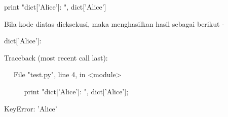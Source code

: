 \documentclass[a4paper,12pt]{report}
\begin{document}
\noindent 
 \hspace*{0.5in} print "dict['Alice']: ", dict['Alice'] \par
\begin{adjustwidth}{0.03in}{0.03in}
Bila kode diatas dieksekusi, maka menghasilkan hasil sebagai berikut -\end{adjustwidth}
 \par
\noindent 
{\fontsize{9pt}{9pt}\selectfont  \hspace*{0.5in} dict['Alice']:} \par
\noindent 
{\fontsize{9pt}{9pt}\selectfont  \hspace*{0.5in} Traceback (most recent call last):} \par
\noindent 
{\fontsize{9pt}{9pt}\selectfont  \hspace*{0.5in} ~~ File "test.py", line 4, in <module>} \par
\noindent 
{\fontsize{9pt}{9pt}\selectfont ~~~~~  \hspace*{0.5in}  \hspace*{0.5in} print "dict['Alice']: ", dict['Alice'];} \par
\noindent 
{\fontsize{9pt}{9pt}\selectfont  \hspace*{0.5in}  \hspace*{0.5in} KeyError: 'Alice'} \par
\vspace{12pt}
\vspace{12pt}
\end{document}
